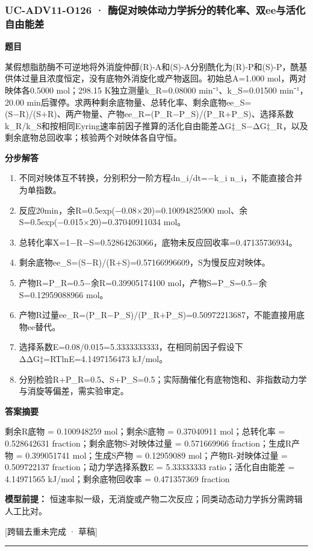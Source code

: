 \documentclass[UTF8,11pt,a4paper]{ctexart}
\begin{document}
\subsubsection*{UC-ADV11-O126 · 酶促对映体动力学拆分的转化率、双ee与活化自由能差}
\noindent\textbf{题目}\par
某假想脂肪酶不可逆地将外消旋仲醇(R)-A和(S)-A分别酰化为(R)-P和(S)-P，酰基供体过量且浓度恒定，没有底物外消旋化或产物返回。初始总A=1.000 mol，两对映体各0.5000 mol；298.15 K独立测量k\_R=0.08000 min⁻¹、k\_S=0.01500 min⁻¹，20.00 min后骤停。求两种剩余底物量、总转化率、剩余底物ee\_S=(S−R)/(S+R)、两产物量、产物ee\_R=(P\_R−P\_S)/(P\_R+P\_S)、选择系数k\_R/k\_S和按相同Eyring速率前因子推算的活化自由能差ΔG‡\_S−ΔG‡\_R，以及剩余底物总回收率；核验两个对映体各自守恒。\par
\medskip\noindent\textbf{分步解答}
\begin{enumerate}
\item 不同对映体互不转换，分别积分一阶方程dn\_i/dt=−k\_i n\_i，不能直接合并为单指数。
\item 反应20min，余R=0.5exp(−0.08×20)=0.10094825900 mol、余S=0.5exp(−0.015×20)=0.37040911034 mol。
\item 总转化率X=1−R−S=0.52864263066，底物未反应回收率=0.47135736934。
\item 剩余底物ee\_S=(S−R)/(R+S)=0.57166996609，S为慢反应对映体。
\item 产物R=P\_R=0.5−余R=0.39905174100 mol，产物S=P\_S=0.5−余S=0.12959088966 mol。
\item 产物R过量ee\_R=(P\_R−P\_S)/(P\_R+P\_S)=0.50972213687，不能直接用底物ee替代。
\item 选择系数E=0.08/0.015=5.3333333333，在相同前因子假设下ΔΔG‡=RTlnE=4.1497156473 kJ/mol。
\item 分别检验R+P\_R=0.5、S+P\_S=0.5；实际酶催化有底物饱和、非指数动力学与消旋等偏差，需实验审定。
\end{enumerate}
\noindent\textbf{答案摘要}\par
剩余R底物 = 0.100948259 mol；剩余S底物 = 0.37040911 mol；总转化率 = 0.528642631 fraction；剩余底物S-对映体过量 = 0.571669966 fraction；生成R产物 = 0.399051741 mol；生成S产物 = 0.12959089 mol；产物R-对映体过量 = 0.509722137 fraction；动力学选择系数E = 5.33333333 ratio；活化自由能差 = 4.14971565 kJ/mol；剩余底物回收率 = 0.471357369 fraction\par
\noindent\textbf{模型前提：}
恒速率拟一级，无消旋或产物二次反应；同类动态动力学拆分需跨辑人工比对。\par
\noindent\textcolor{red!65!black}{[跨辑去重未完成 · 草稿]} \par
\medskip\hrule\medskip
{}
\end{document}
